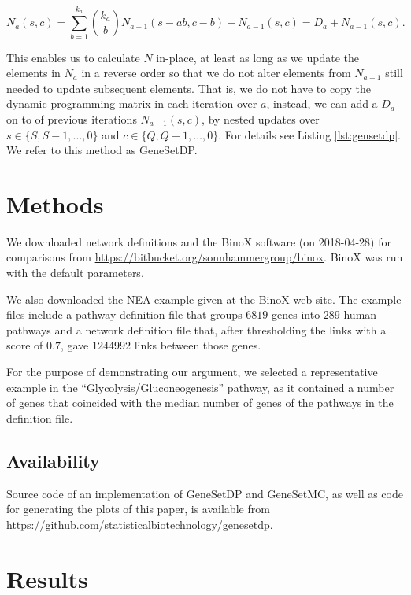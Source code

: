 \documentclass[a4paper,american]{lipics-v2016}
\begin{document}
\[
N_a(s,c)=\sum_{b=1}^{k_a}{k_a \choose b} N_{a-1}(s-ab,c-b) + N_{a-1}(s,c)=D_a+N_{a-1}(s,c).
\]


This enables us to calculate $N$ in-place, at least as long as we update the elements in $N_a$ in a reverse order so that we do not alter elements from $N_{a-1}$ still needed to update subsequent elements. That is, we do not have to copy the dynamic programming matrix in each iteration over $a$, instead, we can add a $D_a$ on to of previous iterations $N_{a-1}(s,c)$, by nested updates over $s \in \{ S, S-1, \ldots, 0 \}$ and $c \in \{ Q, Q-1, \ldots, 0 \}$. For details see Listing \ref{lst:gensetdp}. We refer to this method as GeneSetDP.

\section*{Methods}

We downloaded network definitions and the BinoX software (on 2018-04-28) for comparisons from \url{https://bitbucket.org/sonnhammergroup/binox}. BinoX was run with the default parameters.

We also downloaded the NEA example given at the BinoX web site. The example files include a pathway definition file that groups $6819$ genes into $289$ human pathways and a network definition file that, after thresholding the links with a score of $0.7$, gave $1244992$ links between those genes.

For the purpose of demonstrating our argument, we selected a representative example in the ``Glycolysis/Gluconeogenesis'' pathway, as it contained a number of genes that coincided with the median number of genes of the pathways in the definition file.

\subsection*{Availability}

Source code of an implementation of GeneSetDP and GeneSetMC, as well as code for generating the plots of this paper, is available from \url{https://github.com/statisticalbiotechnology/genesetdp}.

\section*{Results}
\end{document}
